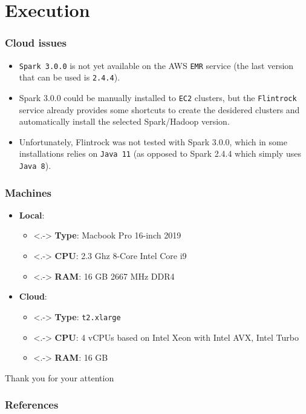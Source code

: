 \documentclass{beamer}
\begin{document}
\section{Execution}
\begin{frame}
  \frametitle{Cloud issues}
  \begin{itemize}[<+->]
    \item \texttt{Spark 3.0.0} is not yet available on the AWS \texttt{EMR} service (the last version that can be used is \texttt{2.4.4}).
    \item Spark 3.0.0 could be manually installed to \texttt{EC2} clusters, but the \texttt{Flintrock} service already provides some shortcuts to create the desidered clusters and automatically install the selected Spark/Hadoop version.
    \item Unfortunately, Flintrock was not tested with Spark 3.0.0, which in some installations relies on \texttt{Java 11} (as opposed to Spark 2.4.4 which simply uses \texttt{Java 8}).
  \end{itemize}
\end{frame}

\begin{frame}
  \frametitle{Machines}
  \begin{itemize}[<+->]
    \item \textbf{Local}:
    \begin{itemize}
      \item<.-> \textbf{Type}: Macbook Pro 16-inch 2019
      \item<.-> \textbf{CPU}: 2.3 Ghz 8-Core Intel Core i9
      \item<.-> \textbf{RAM}: 16 GB 2667 MHz DDR4
    \end{itemize}
    \item \textbf{Cloud}: 
      \begin{itemize}
        \item<.-> \textbf{Type}: \texttt{t2.xlarge}
        \item<.-> \textbf{CPU}: 4 vCPUs based on Intel Xeon with Intel AVX, Intel Turbo
        \item<.-> \textbf{RAM}: 16 GB
    \end{itemize}
  \end{itemize}
\end{frame}


\appendix

\begin{frame}[standout]
	Thank you for your attention
\end{frame}

\begin{frame}
	\frametitle{References}
	\nocite{*}
    
    
\end{frame}
\end{document}
